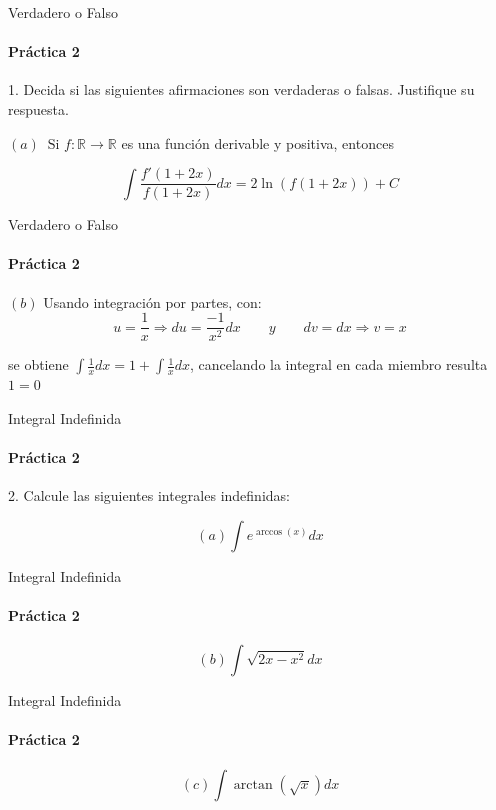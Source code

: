 \documentclass{plantillaPPT}
\begin{document}
\primeraDiapo

\begin{frame}{Verdadero o Falso}
    \framesubtitle{Práctica 2}
    \vspace{-1cm}
1. Decida si las siguientes afirmaciones son verdaderas o falsas. Justifique su respuesta. \vspace{1cm}

\((a) \; \; \text{Si } f: \mathbb{R} \to \mathbb{R}\) es una función derivable y positiva, entonces

\[\int \frac{f'(1+2x)}{f(1+2x)}dx = 2\ln(f(1+2x)) + C\]

    
\end{frame}

\begin{frame}{Verdadero o Falso}
    \framesubtitle{Práctica 2}

\((b)\) Usando integración por partes, con:
\[u=\frac{1}{x} \Rightarrow du= \frac{-1}{x^2}dx \qquad y \qquad 
dv = dx \Rightarrow v=x\]

se obtiene \(\int \frac{1}{x}dx = 1 + \int \frac{1}{x}dx\), cancelando la integral en cada miembro resulta \(1=0\)
    
\end{frame}

\begin{frame}{Integral Indefinida}
    \framesubtitle{Práctica 2}
    \vspace{-1cm}

2. Calcule las siguientes integrales indefinidas:
\vspace{0.5cm}

\[(a) \int e^{\arccos(x)}dx\]

\end{frame}

\begin{frame}{Integral Indefinida}
    \framesubtitle{Práctica 2}

\[(b) \int \sqrt{2x-x^2}dx\]
    
\end{frame}

\begin{frame}{Integral Indefinida}
    \framesubtitle{Práctica 2}

\[(c) \int \arctan(\sqrt{x}) dx\]
    
\end{frame}
\end{document}
